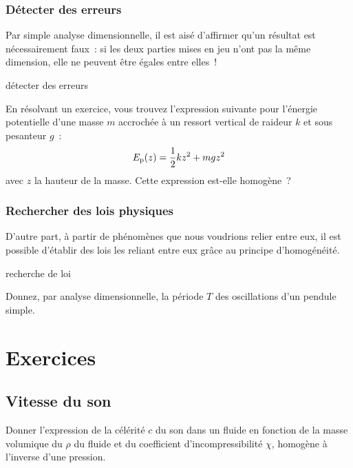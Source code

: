 \documentclass[../main/main.tex]{subfiles}
\begin{document}
\subsubsection{Détecter des erreurs}

Par simple analyse dimensionnelle, il est aisé d'affirmer qu'un résultat est
nécessairement faux~: si les deux parties mises en jeu n'ont pas la même
dimension, elle ne peuvent être égales entre elles~!

\begin{exem}[label=exem:homoerr]{détecter des erreurs}

    En résolvant un exercice, vous trouvez l'expression suivante pour l'énergie
    potentielle d'une masse $m$ accrochée à un ressort vertical de raideur $k$
    et sous pesanteur $g$~:
    \[E_{\rm p} (z) = \frac{1}{2}kz^2 + mgz^2\]
    avec $z$ la hauteur de la masse. Cette expression est-elle homogène~?
    \tcblower
    \vspace{6cm}
\end{exem}

\subsubsection{Rechercher des lois physiques}
D'autre part, à partir de phénomènes que nous voudrions relier entre eux, il est
possible d'établir des lois les reliant entre eux grâce au principe
d'homogénéité.

\begin{exem}[label=exem:homoloi]{recherche de loi}

    Donnez, par analyse dimensionnelle, la période $T$ des oscillations d'un
    pendule simple.
    \tcblower
    \vspace{6cm}
\end{exem}

\newpage
\section{Exercices}
\subsection{Vitesse du son}

Donner l'expression de la célérité $c$ du son dans un fluide en fonction de la
masse volumique du $\rho$ du fluide et du coefficient d'incompressibilité
$\chi$, homogène à l'inverse d'une pression.
\end{document}
